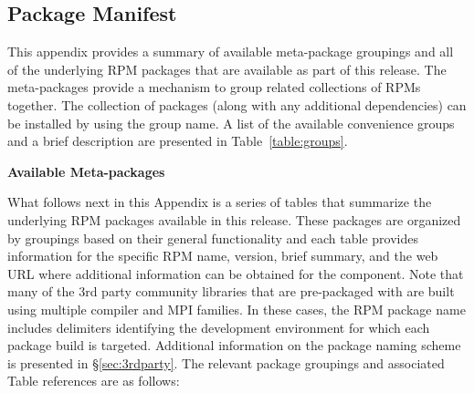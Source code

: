 \clearpage

\newcommand{\captionSpace}{-0.15cm}
\newcommand{\tabSpaceBot}{1.0cm}
\captionsetup{justification=raggedright,singlelinecheck=false}

\subsection{Package Manifest} \label {appendix:manifest}

\vspace*{0.25cm}
This appendix provides a summary of available meta-package groupings and all of the
underlying RPM packages that are available as part of this \OHPC{} release. The
meta-packages provide a mechanism to group related collections of RPMs
together. The collection of packages (along with any additional dependencies)
can be installed by using the group name. A list of the available convenience
groups and a brief description are presented in Table~\ref{table:groups}.

\vspace*{1.25cm}
\begin{table}[h] 
\caption{\bf Available \OHPC{} Meta-packages} \vspace*{\captionSpace{}}
\label{table:groups}

\end{table}

\newpage
What follows next in this Appendix is a series of tables that summarize the
underlying RPM packages available in this \OHPC{} release. These packages are
organized by groupings based on their general functionality and each table
provides information for the specific RPM name, version, brief summary, and the
web URL where additional information can be obtained for the component. Note
that many of the 3rd party community libraries that are pre-packaged
with \OHPC{} are built using multiple compiler and MPI families. In these cases,
the RPM package name includes delimiters identifying the development
environment for which each package build is targeted.  Additional information
on the \OHPC{} package naming scheme is presented in \S\ref{sec:3rdparty}. 
The relevant package groupings and associated Table references are as follows:

\vspace*{0.1cm}

